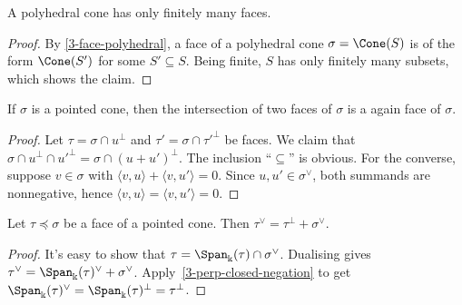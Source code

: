 \begin{lemma}
  \label{3-faces-polyhedral-cone-finite}
  A polyhedral cone has only finitely many faces.
\end{lemma}
\begin{proof}
  \uses{}
  By \ref{3-face-polyhedral}, a face of a polyhedral cone \( \sigma =
  \Cone(S) \) is of the form \( \Cone(S') \) for some \( S' \subseteq
  S \). Being finite, \( S \) has only finitely many subsets, which
  shows the claim.
\end{proof}


\begin{lemma}
  \label{3-face-intersection}
  If \( \sigma \) is a pointed cone, then the intersection of two
  faces of \( \sigma \) is a again face of \( \sigma \).
\end{lemma}
\begin{proof}
  \uses{}
  Let \( \tau = \sigma \cap u^{\perp} \) and \( \tau' = \sigma \cap
  \tau'^{\perp} \) be faces. We claim that \( \sigma \cap u^{\perp}
  \cap u'^{\perp} = \sigma \cap (u + u')^{\perp} \). The inclusion
  ``\( \subseteq \)'' is obvious. For the converse, suppose \( v \in
  \sigma \) with \( \langle v, u \rangle + \langle v, u' \rangle = 0
  \). Since \( u, u' \in \sigma^{\vee} \), both summands are
  nonnegative, hence \( \langle v, u \rangle = \langle v, u' \rangle =
  0 \).
\end{proof}

\begin{lemma}
  \label{3-face-dual-eq-sum}
  Let \( \tau \preceq \sigma \) be a face of a pointed cone. Then \(
  \tau^{\vee} = \tau^{\perp} + \sigma^{\vee} \).
\end{lemma}
\begin{proof}
  It's easy to show that \( \tau = \Span_{\Bbbk}(\tau) \cap
  \sigma^{\vee} \). Dualising gives \( \tau^{\vee} =
  \Span_{\Bbbk}(\tau)^{\vee} + \sigma^{\vee} \).
  Apply~\ref{3-perp-closed-negation} to get \(
  \Span_{\Bbbk}(\tau)^{\vee} = \Span_{\Bbbk}(\tau)^{\perp} =
  \tau^{\perp} \).
\end{proof}



